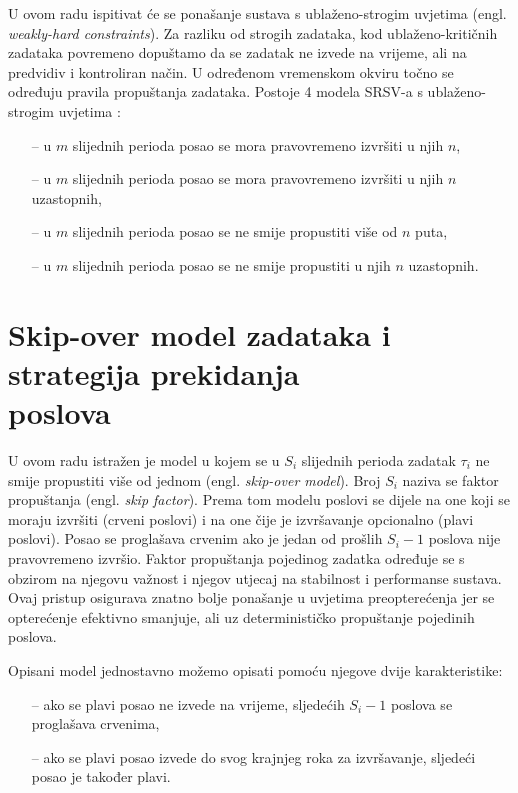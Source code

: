 \documentclass[../zavrsni.tex]{subfiles}
\begin{document}

U ovom radu ispitivat će se ponašanje sustava s ublaženo-strogim uvjetima (engl. \textit{weakly-hard constraints}). Za razliku od 
strogih zadataka, kod ublaženo-kritičnih zadataka povremeno dopuštamo da se zadatak ne izvede na vrijeme, ali na predvidiv i 
kontroliran način. U određenom vremenskom okviru točno se određuju pravila propuštanja zadataka. Postoje 4 modela SRSV-a s ublaženo-strogim uvjetima \cite{clanak_2} :
\begin{itemize}
    \item[--] u $m$ slijednih perioda posao se mora pravovremeno izvršiti u njih $n$,
    \item[--] u $m$ slijednih perioda posao se mora pravovremeno izvršiti u njih $n$ uzastopnih,
    \item[--] u $m$ slijednih perioda posao se ne smije propustiti više od $n$ puta,
    \item[--] u $m$ slijednih perioda posao se ne smije propustiti u njih $n$ uzastopnih.
\end{itemize}

\section{Skip-over model zadataka i strategija prekidanja \\poslova}

U ovom radu istražen je model u kojem se u $S_i$ slijednih perioda zadatak $\tau_i$ ne smije propustiti više od jednom (engl. \textit{skip-over model}).
Broj $S_i$ naziva se faktor propuštanja (engl. \textit{skip factor}).
Prema tom modelu 
poslovi se dijele na one koji se moraju izvršiti (crveni poslovi) i na one čije je izvršavanje opcionalno (plavi poslovi). Posao se proglašava crvenim 
ako je jedan od prošlih $S_i-1$ poslova nije pravovremeno izvršio.
Faktor propuštanja pojedinog zadatka određuje se s obzirom na njegovu važnost i njegov utjecaj na stabilnost i performanse 
sustava. Ovaj pristup osigurava znatno bolje ponašanje u uvjetima preopterećenja jer se opterećenje efektivno smanjuje, ali uz determinističko propuštanje pojedinih poslova.

Opisani model jednostavno možemo opisati pomoću njegove dvije karakteristike:
\begin{itemize}
  \item[--] ako se plavi posao ne izvede na vrijeme, sljedećih $S_i-1$ poslova se proglašava crvenima,
  \item[--] ako se plavi posao izvede do svog krajnjeg roka za izvršavanje, sljedeći posao je također plavi.
\end{itemize}
\end{document}
